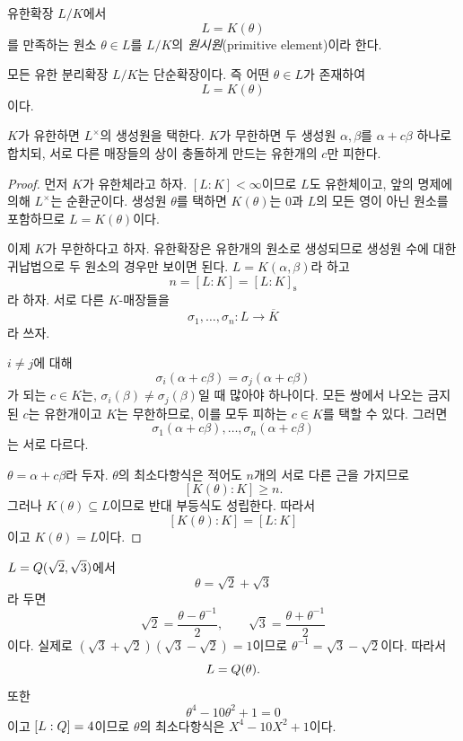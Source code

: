 \begin{definition}[원시원]
유한확장 $L/K$에서
\[
  L=K(\theta)
\]
를 만족하는 원소 $\theta\in L$를 $L/K$의 \emph{원시원}(primitive element)이라 한다.
\end{definition}

\begin{theorem}[원시원 정리]
모든 유한 분리확장 $L/K$는 단순확장이다. 즉 어떤 $\theta\in L$가 존재하여
\[
  L=K(\theta)
\]
이다.
\end{theorem}

\begin{proofidea}
$K$가 유한하면 $L^\times$의 생성원을 택한다. $K$가 무한하면 두 생성원 $\alpha,\beta$를 $\alpha+c\beta$ 하나로 합치되, 서로 다른 매장들의 상이 충돌하게 만드는 유한개의 $c$만 피한다.
\end{proofidea}

\begin{proof}
먼저 $K$가 유한체라고 하자. $[L:K]<\infty$이므로 $L$도 유한체이고, 앞의 명제에 의해 $L^\times$는 순환군이다. 생성원 $\theta$를 택하면 $K(\theta)$는 $0$과 $L$의 모든 영이 아닌 원소를 포함하므로 $L=K(\theta)$이다.

이제 $K$가 무한하다고 하자. 유한확장은 유한개의 원소로 생성되므로 생성원 수에 대한 귀납법으로 두 원소의 경우만 보이면 된다. $L=K(\alpha,\beta)$라 하고
\[
  n=[L:K]=[L:K]_{\mathrm s}
\]
라 하자. 서로 다른 $K$-매장들을
\[
  \sigma_1,\dots,\sigma_n:L\longrightarrow\overline K
\]
라 쓰자.

$i\ne j$에 대해
\[
  \sigma_i(\alpha+c\beta)=\sigma_j(\alpha+c\beta)
\]
가 되는 $c\in K$는, $\sigma_i(\beta)\ne\sigma_j(\beta)$일 때 많아야 하나이다. 모든 쌍에서 나오는 금지된 $c$는 유한개이고 $K$는 무한하므로, 이를 모두 피하는 $c\in K$를 택할 수 있다. 그러면
\[
  \sigma_1(\alpha+c\beta),\dots,
  \sigma_n(\alpha+c\beta)
\]
는 서로 다르다.

$\theta=\alpha+c\beta$라 두자. $\theta$의 최소다항식은 적어도 $n$개의 서로 다른 근을 가지므로
\[
  [K(\theta):K]\ge n.
\]
그러나 $K(\theta)\subseteq L$이므로 반대 부등식도 성립한다. 따라서
\[
  [K(\theta):K]=[L:K]
\]
이고 $K(\theta)=L$이다.
\end{proof}

\begin{example}
$L=Q(\sqrt2,\sqrt3)$에서
\[
  \theta=\sqrt2+\sqrt3
\]
라 두면
\[
  \sqrt2=\frac{\theta-\theta^{-1}}2,
  \qquad
  \sqrt3=\frac{\theta+\theta^{-1}}2
\]
이다. 실제로 $(\sqrt3+\sqrt2)(\sqrt3-\sqrt2)=1$이므로 $\theta^{-1}=\sqrt3-\sqrt2$이다. 따라서
\[
  L=Q(\theta).
\]
또한
\[
  \theta^4-10\theta^2+1=0
\]
이고 $[L:Q]=4$이므로 $\theta$의 최소다항식은 $X^4-10X^2+1$이다.
\end{example}

